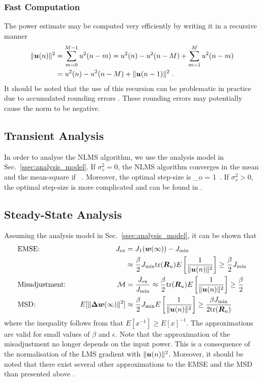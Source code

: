 \subsubsection{Fast Computation}
The power estimate may be computed very efficiently by writing it in a recursive manner
\begin{align}
  \|\boldsymbol{u}(n)\|^2 &= \sum_{m=0}^{M-1}u^2(n-m) = u^2(n) - u^2(n-M) + \sum_{m=1}^{M}u^2(n-m)\notag\\
  &= u^2(n) - u^2(n-M) + \|\boldsymbol{u}(n-1)\|^2\ .
\end{align}
It should be noted that the use of this recursion can be problematic in practice due to accumulated rounding errors \cite[p.~227]{Sayed2003}. These rounding errors may potentially cause the norm to be negative.

\subsection{Transient Analysis}
In order to analyse the NLMS algorithm, we use the analysis model in Sec.~\ref{ssec:analysis_model}. If $\sigma_v^2=0$, the NLMS algorithm converges in the mean and the mean-square if \cite[p.~325]{Haykin2001}
\bmath
  \ .
\emath
Moreover, the optimal step-size is
\bmath
  \beta_o = 1\ .
\emath
If $\sigma_v^2>0$, the optimal step-size is more complicated and can be found in \cite[p.~325]{Haykin2001}.

\subsection{Steady-State Analysis}
Assuming the analysis model in Sec.~\ref{ssec:analysis_model}, it can be shown that \cite[pp.~300--302,p.~474]{Sayed2003}
\begin{alignat}{2}
  &\text{EMSE:}&\quad J_\textup{ex} &= J_1(\boldsymbol{w}(\infty))-J_\textup{min}\notag\\
  & &\quad &\approx \frac{\beta}{2} J_\textup{min}\textup{tr}(\boldsymbol{R}_u)E\left[\frac{1}{\|\boldsymbol{u}(n)\|^2}\right]\geq\frac{\beta}{2} J_\textup{min}\\
  &\text{Misadjustment:}&\quad \mathcal{M} &= \frac{ J_\textup{ex}}{J_\textup{min}} \approx \frac{\beta}{2}\textup{tr}(\boldsymbol{R}_u)E\left[\frac{1}{\|\boldsymbol{u}(n)\|^2}\right]\geq\frac{\beta}{2}\\
  &\text{MSD:} &\quad E[\|\boldsymbol{\Delta}\boldsymbol{w}(\infty)\|^2] &\approx \frac{\beta}{2} J_\textup{min} E\left[\frac{1}{\|\boldsymbol{u}(n)\|^2}\right] \geq \frac{\beta J_\textup{min}}{2\textup{tr}(\boldsymbol{R}_u)}
\end{alignat}
where the inequality follows from that $E[x^{-1}]\geq E[x]^{-1}$. The approximations are valid for small values of $\beta$ and $\epsilon$. Note that the approximation of the misadjustment no longer depends on the input power. This is a consequence of the normalisation of the LMS gradient with $\|\boldsymbol{u}(n)\|^2$. Moreover, it should be noted that there exist several other approximations to the EMSE and the MSD than presented above \cite[p.~474]{Sayed2003}.


